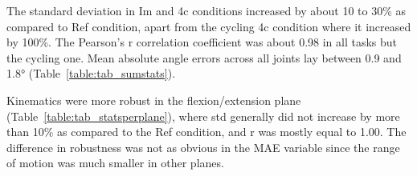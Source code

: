 The standard deviation in Im and 4c conditions increased by about 10 to 30\% as compared to Ref condition, apart from the cycling 4c condition where it increased by 100\%. The Pearson’s r correlation coefficient was about 0.98 in all tasks but the cycling one. Mean absolute angle errors across all joints lay between 0.9 and 1.8° (Table~\ref{table:tab_sumstats}).

\clearpage
Kinematics were more robust in the flexion/extension plane (Table~\ref{table:tab_statsperplane}), where std generally did not increase by more than 10\% as compared to the Ref condition, and r was mostly equal to 1.00. The difference in robustness was not as obvious in the MAE variable since the range of motion was much smaller in other planes.

\begin{table}[!ht]
\end{table}
